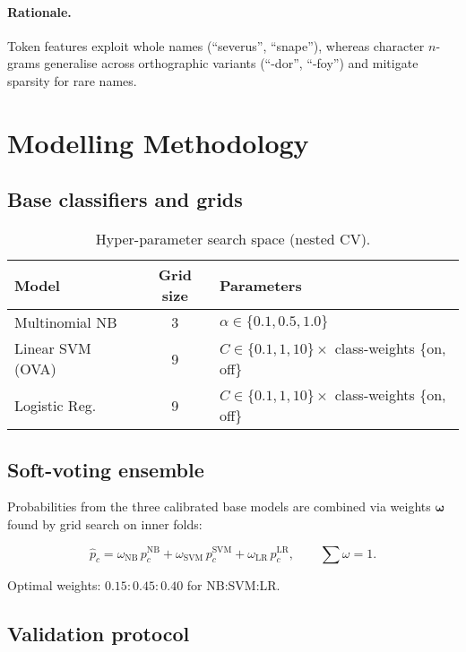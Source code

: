 \documentclass[12pt,a4paper]{article}
\begin{document}
\paragraph{Rationale.}
Token features exploit whole names (“severus”, “snape”), whereas
character $n$-grams generalise across orthographic variants
(“-dor”, “-foy”) and mitigate sparsity for rare names.

\section{Modelling Methodology}\label{sec:models}

\subsection{Base classifiers and grids}

\begin{table}[H]
  \centering
  \caption{Hyper-parameter search space (nested CV).}
  \label{tab:grid}
  \begin{tabular}{@{}lcl@{}}
    \toprule
    Model & Grid size & Parameters \\
    \midrule
    Multinomial NB & 3 & $\alpha \in \{0.1,0.5,1.0\}$ \\
    Linear SVM (OVA) & 9 & $C \in \{0.1,1,10\}\times$ class-weights \{on, off\} \\
    Logistic Reg. & 9 & $C \in \{0.1,1,10\}\times$ class-weights \{on, off\} \\
    \bottomrule
  \end{tabular}
\end{table}

\subsection{Soft-voting ensemble}

Probabilities from the three calibrated base models are combined via
weights \(\boldsymbol{\omega}\) found by grid search on inner folds:

\[
  \hat{p}_c = \omega_{\text{NB}}\,p_c^{\text{NB}} +
              \omega_{\text{SVM}}\,p_c^{\text{SVM}} +
              \omega_{\text{LR}}\,p_c^{\text{LR}},\qquad
  \textstyle\sum\omega = 1.
\]

Optimal weights: \(0.15{:}0.45{:}0.40\) for NB:SVM:LR.

\subsection{Validation protocol}
\end{document}
